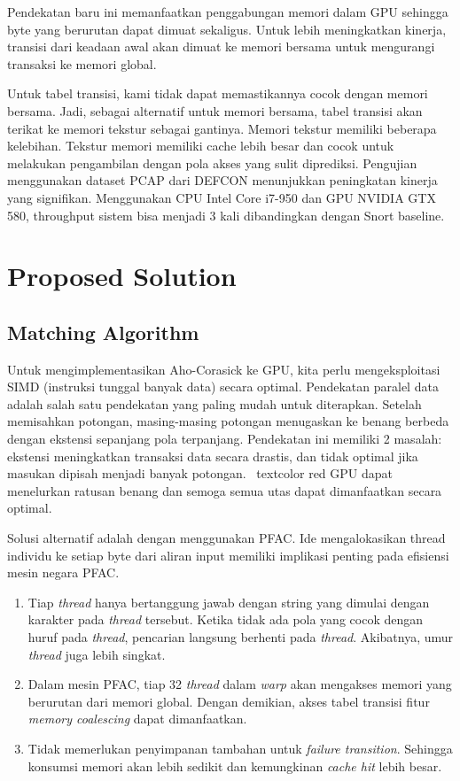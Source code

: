 \documentclass[conference]{IEEEtran}
\begin{document}
        Pendekatan baru ini memanfaatkan penggabungan memori dalam GPU sehingga byte yang berurutan dapat dimuat sekaligus. Untuk lebih meningkatkan kinerja, transisi dari keadaan awal akan dimuat ke memori bersama untuk mengurangi transaksi ke memori global.
        
        Untuk tabel transisi, kami tidak dapat memastikannya cocok dengan memori bersama. Jadi, sebagai alternatif untuk memori bersama, tabel transisi akan terikat ke memori tekstur sebagai gantinya. Memori tekstur memiliki beberapa kelebihan. Tekstur memori memiliki cache lebih besar dan cocok untuk melakukan pengambilan dengan pola akses yang sulit diprediksi. Pengujian menggunakan dataset PCAP dari DEFCON menunjukkan peningkatan kinerja yang signifikan. Menggunakan CPU Intel Core i7-950 dan GPU NVIDIA GTX 580, throughput sistem bisa menjadi 3 kali dibandingkan dengan Snort baseline.

\section{Proposed Solution}
    \subsection{Matching Algorithm}
        Untuk mengimplementasikan Aho-Corasick ke GPU, kita perlu mengeksploitasi SIMD (instruksi tunggal banyak data) secara optimal. Pendekatan paralel data adalah salah satu pendekatan yang paling mudah untuk diterapkan. Setelah memisahkan potongan, masing-masing potongan menugaskan ke benang berbeda dengan ekstensi sepanjang pola terpanjang. Pendekatan ini memiliki 2 masalah: ekstensi meningkatkan transaksi data secara drastis, dan tidak optimal jika masukan dipisah menjadi banyak potongan. \ textcolor {red} {GPU dapat menelurkan ratusan benang dan semoga semua utas dapat dimanfaatkan secara optimal.}
        
        Solusi alternatif adalah dengan menggunakan PFAC. Ide mengalokasikan thread individu ke setiap byte dari aliran input memiliki implikasi penting pada efisiensi mesin negara PFAC.

        \begin{enumerate}
            \item 
            Tiap \emph{thread} hanya bertanggung jawab dengan string yang dimulai dengan karakter pada \emph{thread} tersebut. Ketika tidak ada pola yang cocok dengan huruf pada \emph{thread}, pencarian langsung berhenti pada \emph{thread}. Akibatnya, umur \emph{thread} juga lebih singkat.
            
            \item
            Dalam mesin PFAC, tiap 32 \emph{thread} dalam \emph{warp} akan mengakses memori yang berurutan dari memori global. Dengan demikian, akses tabel transisi fitur \emph{memory coalescing} dapat dimanfaatkan.

            \item
            Tidak memerlukan penyimpanan tambahan untuk \emph{failure transition}. Sehingga konsumsi memori akan lebih sedikit dan kemungkinan \emph{cache hit} lebih besar.
        \end{enumerate}
\end{document}
